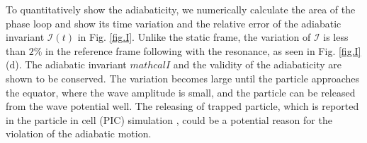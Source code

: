 To quantitatively show the adiabaticity, we numerically calculate the area of the phase loop and show its time variation 
and the relative error of the adiabatic invariant $\mathcal{I}(t)$ in Fig. \ref{fig.I}.
Unlike the static frame, the variation of $\mathcal{I}$ is less than $2\%$ in the reference frame following with the resonance,
as seen in Fig. \ref{fig.I}(d). 
The adiabatic invariant $mathcalI$ and the validity of the adiabaticity are shown to be conserved. 
The variation becomes large until the particle approaches the equator, where the wave amplitude is small, and the particle can be released from the wave potential well. 
The releasing of trapped particle, which is reported in the particle in cell (PIC) simulation \cite{tao_trap-release-amplify_2021}, could be a potential reason for the violation of the adiabatic motion.


